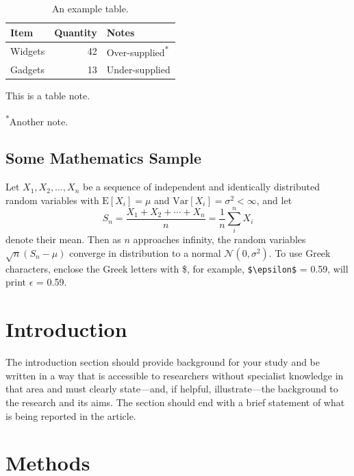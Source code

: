 \documentclass[a4paper,num-refs]{ehi-journals}
\begin{document}
\begin{table}[bt!]
\caption{An example table.}\label{tab:example}
\begin{tabular}{l r l}
\toprule
Item & Quantity & Notes\\
\midrule
Widgets & 42 & Over-supplied\textsuperscript{*} \\
Gadgets & 13 & Under-supplied \\
\bottomrule
\end{tabular}
\begin{tablenotes}
\item This is a table note.
\item \textsuperscript{*}Another note.
\end{tablenotes}
\end{table}


\subsection{Some Mathematics Sample}

Let $X_1, X_2, \ldots, X_n$ be a sequence of independent and identically distributed random variables with $\text{E}[X_i] = \mu$ and $\text{Var}[X_i] = \sigma^2 < \infty$, and let
%
\begin{equation}
S_n = \frac{X_1 + X_2 + \cdots + X_n}{n}
      = \frac{1}{n}\sum_{i}^{n} X_i
\end{equation}
%
denote their mean. Then as $n$ approaches infinity, the random variables $\sqrt{n}(S_n - \mu)$ converge in distribution to a normal $\mathcal{N}(0, \sigma^2)$. To use Greek characters, enclose the Greek letters with \$, for example, \verb|$\epsilon$| = 0.59, will print $\epsilon$ = 0.59.


\section{Introduction}
\label{sec:introduction}

The introduction section should provide background for your study and be written in a way that is accessible to researchers without specialist knowledge in that area and must clearly state---and, if helpful, illustrate---the background to the research and its aims. The section should end with a brief statement of what is being reported in the article.

\section{Methods}
\end{document}
